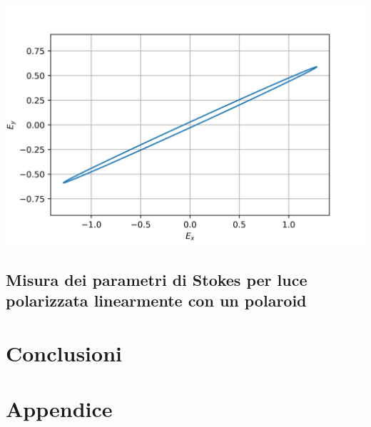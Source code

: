 \documentclass[10pt,oneside,a4paper]{article}
\newenvironment{Figure}
  {\par\medskip\noindent\minipage{\linewidth}}
  {\endminipage\par\medskip}
\begin{document}
\begin{multicols}{2}
\begin{Figure}
	\begin{center}
	\includegraphics[width=\linewidth]{Efield.png}
	\label{fig:Efield}
	\end{center}
\end{Figure}

\subsection{Misura dei parametri di Stokes per luce polarizzata linearmente con un polaroid}



\section{Conclusioni}


\end{multicols}


\newpage
\section{Appendice}
\end{document}
